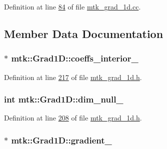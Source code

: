 Definition at line \hyperlink{mtk__grad__1d_8cc_source_l00084}{84} of file \hyperlink{mtk__grad__1d_8cc_source}{mtk\+\_\+grad\+\_\+1d.\+cc}.



\subsection{Member Data Documentation}
\hypertarget{classmtk_1_1Grad1D_a2395861161c26f237e892aacebcc1909}{
\subsubsection[{coeffs\+\_\+interior\+\_\+}]{$\ast$ mtk\+::\+Grad1\+D\+::coeffs\+\_\+interior\+\_\+\hspace{0.3cm}{\ttfamily [private]}}}\label{classmtk_1_1Grad1D_a2395861161c26f237e892aacebcc1909}


Definition at line \hyperlink{mtk__grad__1d_8h_source_l00217}{217} of file \hyperlink{mtk__grad__1d_8h_source}{mtk\+\_\+grad\+\_\+1d.\+h}.

\hypertarget{classmtk_1_1Grad1D_abe8eaf4f5c451f82c062daaef31e9e6a}{
\subsubsection[{dim\+\_\+null\+\_\+}]{\setlength{\rightskip}{0pt plus 5cm}int mtk\+::\+Grad1\+D\+::dim\+\_\+null\+\_\+\hspace{0.3cm}{\ttfamily [private]}}}\label{classmtk_1_1Grad1D_abe8eaf4f5c451f82c062daaef31e9e6a}


Definition at line \hyperlink{mtk__grad__1d_8h_source_l00208}{208} of file \hyperlink{mtk__grad__1d_8h_source}{mtk\+\_\+grad\+\_\+1d.\+h}.

\hypertarget{classmtk_1_1Grad1D_a024b84b1ea285c0c590eb42d40ff4469}{
\subsubsection[{gradient\+\_\+}]{$\ast$ mtk\+::\+Grad1\+D\+::gradient\+\_\+\hspace{0.3cm}{\ttfamily [private]}}}\label{classmtk_1_1Grad1D_a024b84b1ea285c0c590eb42d40ff4469}


